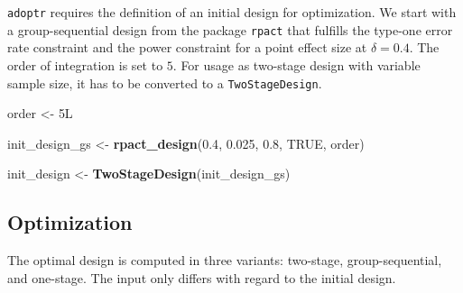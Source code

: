 \documentclass[]{book}
\newenvironment{Shaded}{\begin{snugshade}}{\end{snugshade}}
\newcommand{\ControlFlowTok}[1]{\textcolor[rgb]{0.13,0.29,0.53}{\textbf{#1}}}
\newcommand{\DataTypeTok}[1]{\textcolor[rgb]{0.13,0.29,0.53}{#1}}
\newcommand{\DecValTok}[1]{\textcolor[rgb]{0.00,0.00,0.81}{#1}}
\newcommand{\FloatTok}[1]{\textcolor[rgb]{0.00,0.00,0.81}{#1}}
\newcommand{\KeywordTok}[1]{\textcolor[rgb]{0.13,0.29,0.53}{\textbf{#1}}}
\newcommand{\NormalTok}[1]{#1}
\newcommand{\OperatorTok}[1]{\textcolor[rgb]{0.81,0.36,0.00}{\textbf{#1}}}
\newcommand{\OtherTok}[1]{\textcolor[rgb]{0.56,0.35,0.01}{#1}}
\newcommand{\StringTok}[1]{\textcolor[rgb]{0.31,0.60,0.02}{#1}}
\begin{document}
\texttt{adoptr} requires the definition of an initial design for optimization.
We start with a group-sequential design from the package \texttt{rpact} that
fulfills the type-one error rate constraint and the power
constraint for a point effect size at \(\delta = 0.4\).
The order of integration is set to \(5\).
For usage as two-stage design with variable sample size, it has to
be converted to a \texttt{TwoStageDesign}.

\begin{Shaded}
\begin{Highlighting}[]
\NormalTok{order <-}\StringTok{ }\NormalTok{5L }

\NormalTok{init_design_gs <-}\StringTok{ }\KeywordTok{rpact_design}\NormalTok{(}\FloatTok{0.4}\NormalTok{, }\FloatTok{0.025}\NormalTok{, }\FloatTok{0.8}\NormalTok{, }\OtherTok{TRUE}\NormalTok{, order)}

\NormalTok{init_design    <-}\StringTok{ }\KeywordTok{TwoStageDesign}\NormalTok{(init_design_gs)}
\end{Highlighting}
\end{Shaded}

\hypertarget{optimization-3}{%
\subsection{Optimization}\label{optimization-3}}

The optimal design is computed in three variants: two-stage,
group-sequential, and one-stage.
The input only differs with regard to the initial design.

\begin{Shaded}
\end{Shaded}
\end{document}
